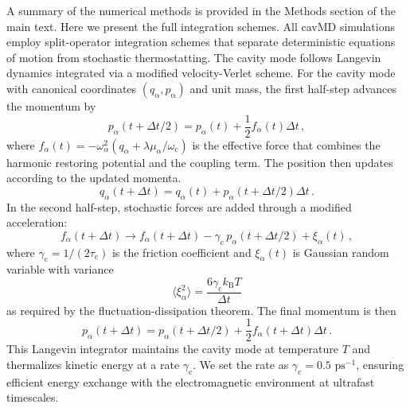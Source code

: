 A summary of the numerical methods is provided in the Methods section of the main text. Here we present the full integration schemes.
All cavMD simulations employ split-operator integration schemes\cite{tuckerman2010statistical} that separate deterministic equations of motion from stochastic thermostatting.
The cavity mode follows Langevin dynamics integrated via a modified velocity-Verlet scheme. 
For the cavity mode with canonical coordinates $(q_\mathrm{\alpha}, p_\mathrm{\alpha})$ and unit mass, the first half-step advances the momentum by
\begin{equation}
p_\alpha\left(t + \Delta t/2\right) = p_\alpha(t) + \frac{1}{2} f_\alpha(t) \Delta t \,,
\end{equation}
where $f_\alpha(t) = -\omega_\alpha^2\!\left(q_\alpha + \lambda \mu_\alpha / \omega_\mathrm{c}\right)$ is the effective force that combines the harmonic restoring potential and the coupling term.
The position then updates according to the updated momenta.
\begin{equation}
q_\alpha(t + \Delta t) = q_\alpha(t) + p_\alpha\left(t + \Delta t/2\right) \Delta t \,.
\end{equation}
In the second half-step, stochastic forces are added through a modified acceleration:
\begin{equation}
f_\alpha(t + \Delta t) \to f_\alpha(t + \Delta t) - \gamma_\mathrm{c} \, p_\alpha\left(t + \Delta t/2\right) + \xi_\alpha(t) \,,
\end{equation}
where $\gamma_\mathrm{c} = 1/(2\tau_\mathrm{c})$ is the friction coefficient and $\xi_\alpha(t)$ is Gaussian random variable with variance %
\begin{equation}
\langle \xi_\alpha^2 \rangle = \frac{6 \gamma_\mathrm{c} k_\mathrm{B} T}{\Delta t}
\end{equation}
as required by the fluctuation-dissipation theorem.\cite{zwanzig2001nonequilibrium}
The final momentum is then
\begin{equation}
p_\alpha(t + \Delta t) = p_\alpha\left(t + \Delta t/2\right) + \frac{1}{2} f_\alpha(t + \Delta t) \Delta t \,.
\end{equation}
This Langevin integrator maintains the cavity mode at temperature $T$ and thermalizes kinetic energy at a rate $\gamma_\mathrm{c}$. We set the rate as $\gamma_\mathrm{c} = 0.5$ $\mathrm{ps}^{-1}$, ensuring efficient energy exchange with the electromagnetic environment at ultrafast timescales.

